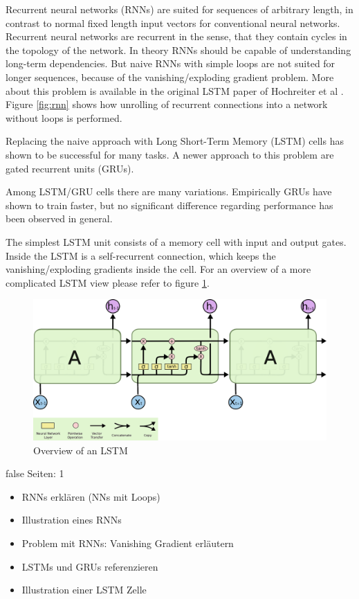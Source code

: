 \documentclass[draft,final,oneside]{vutinfth} %
\begin{document}
Recurrent neural networks (RNNs) are suited for sequences of arbitrary length, in contrast to normal fixed length input vectors for conventional neural networks. Recurrent neural networks are recurrent in the sense, that they contain cycles in the topology of the network. In theory RNNs should be capable of understanding long-term dependencies. But naive RNNs with simple loops are not suited for longer sequences, because of the vanishing/exploding gradient problem. More about this problem is available in the original LSTM paper of Hochreiter et al \cite{hochreiter}. Figure \ref{fig:rnn} shows how unrolling of recurrent connections into a network without loops is performed.

Replacing the naive approach with Long Short-Term Memory (LSTM) cells has shown to be successful for many tasks. A newer approach to this problem are gated recurrent units (GRUs). \cite{gru}

Among LSTM/GRU cells there are many variations. Empirically GRUs have shown to train faster, but no significant difference regarding performance has been observed in general.

The simplest LSTM unit consists of a memory cell with input and output gates. Inside the LSTM is a self-recurrent connection, which keeps the vanishing/exploding gradients inside the cell. For an overview of a more complicated LSTM view please refer to figure \ref{fig:lstm}.

\begin{figure}[ht]
	\centering
  	\includegraphics[width=1.0\textwidth]{graphics/lstm.png}
	\caption{Overview of an LSTM \cite{colahlstm}}
	\label{fig:lstm}
\end{figure}



\if false
Seiten: 1
\begin{itemize}

\item RNNs erklären (NNs mit Loops)
\item Illustration eines RNNs
\item Problem mit RNNs: Vanishing Gradient erläutern
\item LSTMs und GRUs referenzieren
\item Illustration einer LSTM Zelle

\end{itemize}
\fi
\end{document}
